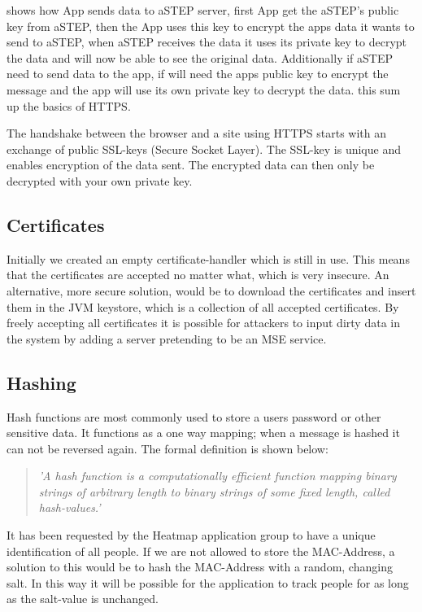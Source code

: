  shows how App sends data to aSTEP server, first App get the aSTEP's public key from aSTEP, then the App uses this key to encrypt the apps data it wants to send to aSTEP, when aSTEP receives the data it uses its private key to decrypt the data and will now be able to see the original data. Additionally if aSTEP need to send data to the app, if will need the apps public key to encrypt the message and the app will use its own private key to decrypt the data. this sum up the basics of HTTPS.

The handshake between the browser and a site using HTTPS starts with an exchange of public SSL-keys (Secure Socket Layer). The SSL-key is unique and enables encryption of the data sent. The encrypted data can then only be decrypted with your own private key\cite{HTTPS}. 

\subsection*{Certificates}
Initially we created an empty certificate-handler which is still in use. This means that the certificates are accepted no matter what, which is very insecure. An alternative, more secure solution, would be to download the certificates and insert them in the JVM keystore, which is a collection of all accepted certificates. By freely accepting all certificates it is possible for attackers to input dirty data in the system by adding a server pretending to be an MSE service.

\subsection*{Hashing}
Hash functions are most commonly used to store a users password or other sensitive data. It functions as a one way mapping; when a message is hashed it can not be reversed again. The formal definition is shown below:
\begin{quote}
\textit{'A hash function is a computationally efficient function mapping binary strings of arbitrary length to binary strings of some fixed length, called hash-values.'\cite{Hash_def}}
\end{quote}

It has been requested by the Heatmap application group to have a unique identification of all people. If we are not allowed to store the MAC-Address, a solution to this would be to hash the MAC-Address with a random, changing salt. In this way it will be possible for the application to track people for as long as the salt-value is unchanged.

